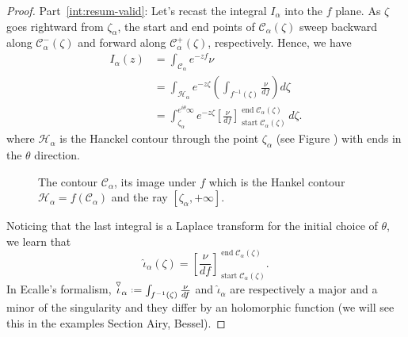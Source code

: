 \documentclass[11pt,a4paper,twoside,leqno,noamsfonts]{amsart}
\numberwithin{equation}{section}
\begin{document}
\begin{proof}
Part~\eqref{int:resum-valid}: Let's recast the integral $I_\alpha$ into the $f$ plane. As $\zeta$ goes rightward from $\zeta_\alpha$, the start and end points of $\mathcal{C}_\alpha(\zeta)$ sweep backward along $\mathcal{C}^-_\alpha(\zeta)$ and forward along $\mathcal{C}^+_\alpha(\zeta)$, respectively. Hence, we have
\begin{align*}
I_\alpha(z) & = \int_{\mathcal{C}_{\alpha}} e^{-zf} \nu \\
&=\int_{\mathcal{H}_{\alpha}}e^{-z\zeta}\left(\int_{f^{-1}(\zeta)}\frac{\nu}{df}\right)d\zeta \\
& = \int_{\zeta_\alpha}^{e^{i\theta}\infty} e^{-z\zeta} \left[\frac{\nu}{df}\right]_{\operatorname{start} \mathcal{C}_\alpha(\zeta)}^{\operatorname{end} \mathcal{C}_\alpha(\zeta)}\,d\zeta.
\end{align*}
where $\mathcal{H}_{\alpha}$ is the Hanckel contour through the point $\zeta_{\alpha}$ (see Figure \cite{fig.paths}) with ends in the $\theta$ direction.
\begin{figure}
\caption{The contour $\mathcal{C}_\alpha$, its image under $f$ which is the Hankel contour $\mathcal{H}_{\alpha}=f(\mathcal{C}_{\alpha})$ and the ray $[\zeta_\alpha,+\infty]$. }
\end{figure}   
Noticing that the last integral is a Laplace transform for the initial choice of $\theta$, we learn that
\begin{equation}\label{thimble-difference}
\hat{\iota}_\alpha(\zeta) = \left[\frac{\nu}{df}\right]_{\operatorname{start} \mathcal{C}_\alpha(\zeta)}^{\operatorname{end} \mathcal{C}_\alpha(\zeta)}.
\end{equation}
In Ecalle's formalism, $\overset{\triangledown}{\iota}_\alpha\defeq\int_{f^{-1}(\zeta)}\frac{\nu}{df}$ and $\hat{\iota}_\alpha$ are respectively a major and a minor of the singularity and they differ by an holomorphic function (we will see this in the examples Section Airy, Bessel). 



\end{proof}
\end{document}
